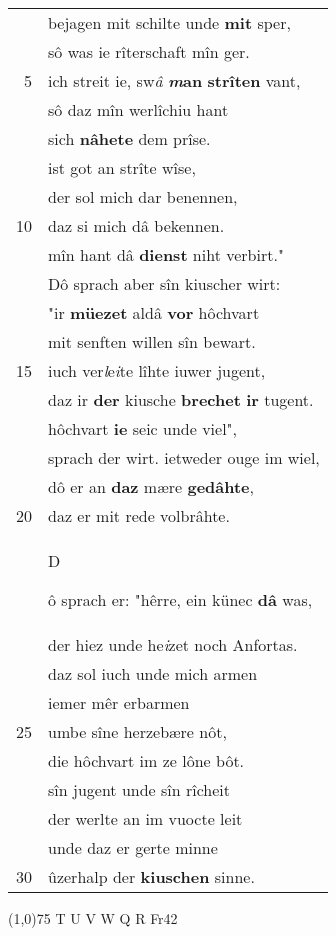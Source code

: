 \documentclass[8pt,a4paper,notitlepage]{article}
\begin{document}
\begin{table}[ht]
\begin{minipage}[t]{0.5\linewidth}
\begin{tabular}{rl}
 & bejagen mit schilte unde \textbf{mit} sper,\\ 
 & sô was ie rîterschaft mîn ger.\\ 
5 & ich streit ie, sw\textit{â} \textbf{\textit{m}an} \textbf{strîten} vant,\\ 
 & sô daz mîn werlîchiu hant\\ 
 & sich \textbf{nâhete} dem prîse.\\ 
 & ist got an strîte wîse,\\ 
 & der sol mich dar benennen,\\ 
10 & daz si mich dâ bekennen.\\ 
 & mîn hant dâ \textbf{dienst} niht verbirt."\\ 
 & Dô sprach aber sîn kiuscher wirt:\\ 
 & "ir \textbf{müezet} aldâ \textbf{vor} hôchvart\\ 
 & mit senften willen sîn bewart.\\ 
15 & iuch ver\textit{l}e\textit{i}te lîhte iuwer jugent,\\ 
 & daz ir \textbf{der} kiusche \textbf{brechet} \textbf{ir} tugent.\\ 
 & hôchvart \textbf{ie} seic unde viel",\\ 
 & sprach der wirt. ietweder ouge im wiel,\\ 
 & dô er an \textbf{daz} mære \textbf{gedâhte},\\ 
20 & daz er mit rede volbrâhte.\\ 
 & \begin{large}D\end{large}ô sprach er: "hêrre, ein künec \textbf{dâ} was,\\ 
 & der hiez unde he\textit{i}zet noch Anfortas.\\ 
 & daz sol iuch unde mich armen\\ 
 & iemer mêr erbarmen\\ 
25 & umbe sîne herzebære nôt,\\ 
 & die hôchvart im ze lône bôt.\\ 
 & sîn jugent unde sîn rîcheit\\ 
 & der werlte an im vuocte leit\\ 
 & unde daz er gerte minne\\ 
30 & ûzerhalp der \textbf{kiuschen} sinne.\\ 
\end{tabular}
\scriptsize
\line(1,0){75} \newline
T U V W Q R Fr42 \newline

\end{minipage}
\end{table}
\end{document}
